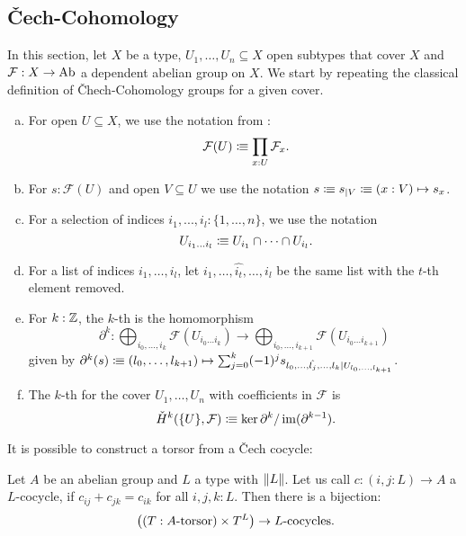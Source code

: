 \subsection{Čech-Cohomology}

In this section, let $X$ be a type, $U_1,\dots,U_n\subseteq X$ open subtypes that cover $X$
and $\mathcal F:X\to \operatorname{Ab}$ a dependent abelian group on $X$.
We start by repeating the classical definition of \v{C}hech-Cohomology groups for a given cover.

\begin{definition}%
  \label{chech-complex}
  \begin{enumerate}[(a)]
  \item {} For open $U\subseteq X$, we use the notation from :
    \[
      \mathcal F(U)\colonequiv \prod_{x:U}\mathcal F_x\rlap{.}
    \]
  \item For $s:\mathcal F(U)$ and open $V\subseteq U$ we use the notation $s\vcentcolon\mspace{-1.2mu}\equiv s_{|V} \vcentcolon\mspace{-1.2mu}\equiv (x:V)\mapsto s_x$.
  \item {}For a selection of indices $i_1,...,i_l:\{1,\dots,n\}$, we use the notation
    \[
      U_{i_1\dots i_l}\colonequiv U_{i_1}\cap\dots\cap U_{i_l}\rlap{.}
    \]
  \item For a list of indices $i_1,\dots,i_l$, let $i_1,\dots,\hat{i_t},\dots,i_l$ be the same list with the $t$-th element removed.
  \item For $k:\mathbb{Z}$, the $k$-th  is the homomorphism
    \[
      \partial^k:\bigoplus_{i_0,\dots,i_k}\mathcal F(U_{i_0\dots i_k})\to \bigoplus_{i_0,\dots,i_{k+1}}\mathcal F(U_{i_0\dots i_{k+1}})
    \]
    given by $\partial^k(s)\vcentcolon\mspace{-1.2mu}\equiv (l_0,\dots,l_{k+1}) \mapsto \sum_{j=0}^k (-1)^j s_{l_0,\dots,\hat{l_j},\dots,l_k|U_{l_0,\dots,l_{k+1}}}$.
  \item The $k$-th  for the cover $U_1,\dots,U_n$ with coefficients in $\mathcal F$ is
    \[
      \check{H}^k(\{U\},\mathcal F)\colonequiv \ker\partial^{k} / \im(\partial^{k-1})\rlap{.}
    \]
  \end{enumerate}
\end{definition}

It is possible to construct a torsor from a \v{C}ech cocycle:

\begin{lemma}%
  \label{deligne-construction}
  Let $A$ be an abelian group and $L$ a type with $\lVert L \rVert$.
  Let us call $c:(i,j:L)\to A$ a $L$-cocycle, if $c_{ij}+c_{jk}=c_{ik}$ for all $i,j,k:L$.
  Then there is a bijection:
  \[
    \left((T:\text{$A$-torsor})\times T^L\right) \to \text{$L$-cocycles}
    \rlap{.}
  \]
\end{lemma}

